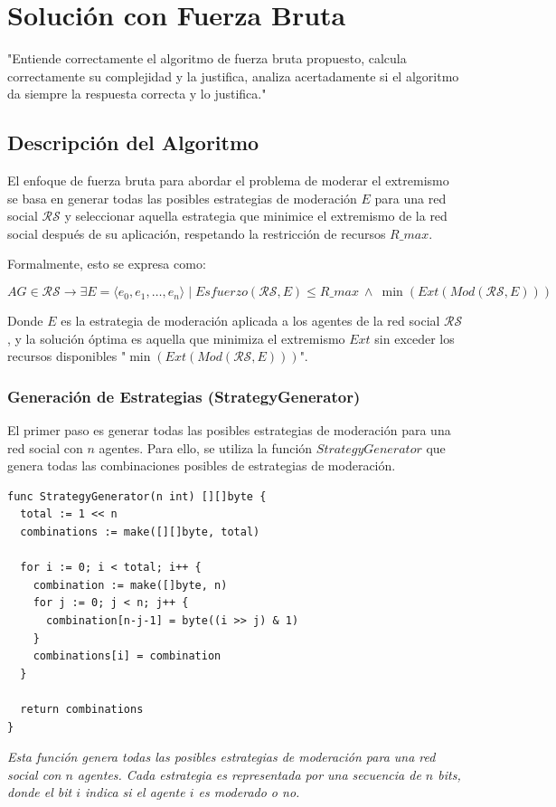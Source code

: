 \documentclass[letterpaper,10pt]{article}
\begin{document}
\section{Solución con Fuerza Bruta}
\label{sec:fuerza_bruta}
"Entiende correctamente el algoritmo de fuerza bruta propuesto, calcula correctamente su complejidad y la justifica, analiza acertadamente si el algoritmo da siempre la respuesta correcta y lo justifica."

\subsection{Descripción del Algoritmo}
\label{subsec:descripcion_fuerza_bruta}
El enfoque de fuerza bruta para abordar el problema de moderar el extremismo se basa en generar todas las posibles estrategias de moderación \( E \) para una red social \( \mathcal{R}\mathcal{S} \) y seleccionar aquella estrategia que minimice el extremismo de la red social después de su aplicación, respetando la restricción de recursos \( R\_max \).

Formalmente, esto se expresa como:

\[
 AG \in \mathcal{R}\mathcal{S} \rightarrow \exists E = \langle e_0, e_1, \ldots, e_n \rangle \mid Esfuerzo(\mathcal{R}\mathcal{S}, E) \leqslant R\_max ~ \wedge ~ \min(Ext(Mod(\mathcal{R}\mathcal{S}, E)))
\]

Donde \( E \) es la estrategia de moderación aplicada a los agentes de la red social \( \mathcal{R}\mathcal{S} \), y la solución óptima es aquella que minimiza el extremismo \( Ext \) sin exceder los recursos disponibles "$\min(Ext(Mod(\mathcal{R}\mathcal{S}, E)))$".

\subsubsection*{Generación de Estrategias (StrategyGenerator)}
El primer paso es generar todas las posibles estrategias de moderación para una red social con \( n \) agentes. Para ello, se utiliza la función \( StrategyGenerator \) que genera todas las combinaciones posibles de estrategias de moderación.
\begin{lstlisting}[caption={Strategy Generator}, label={lst:strategy_generator}]
func StrategyGenerator(n int) [][]byte {
  total := 1 << n
  combinations := make([][]byte, total)
  
  for i := 0; i < total; i++ {
    combination := make([]byte, n)
    for j := 0; j < n; j++ {
      combination[n-j-1] = byte((i >> j) & 1)
    }
    combinations[i] = combination
  }

  return combinations
}
\end{lstlisting}
\textit{Esta función genera todas las posibles estrategias de moderación para una red social con \( n \) agentes. Cada estrategia es representada por una secuencia de \( n \) bits, donde el bit \( i \) indica si el agente \( i \) es moderado o no.
}
\\
\end{document}
